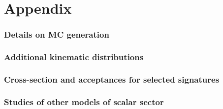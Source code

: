 \documentclass[a4paper, 11pt,notoc]{article}
\begin{document}
\appendix
\part*{Appendix}

\section{Details on MC generation}


\section{Additional kinematic distributions}
\label{app:extraKinematics}


\section{Cross-section and acceptances for selected signatures}


%

\section{Studies of other models of scalar sector}




\end{document}
